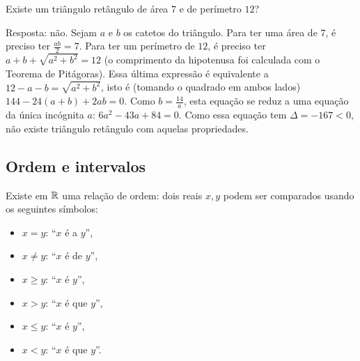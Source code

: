 \begin{exo}
Existe um triângulo retângulo de área $7$ e de perímetro $12$?
\begin{sol} Resposta: não.
Sejam $a$ e $b$ os catetos do triângulo. Para ter uma área de $7$, é preciso ter
$\frac{ab}{2}=7$. Para ter um perímetro de $12$, é preciso ter $a+b+\sqrt{a^2+b^2}=12$
(o comprimento da hipotenusa foi calculada com o Teorema de Pitágoras).
Essa última expressão é equivalente a $12-a-b=\sqrt{a^2+b^2}$, isto é (tomando o quadrado
em ambos lados) $144-24(a+b)+2ab=0$. Como $b=\frac{14}{a}$, esta equação se reduz a uma
equação da única incógnita $a$: $6a^2-43a+84=0$. Como essa equação tem $\Delta=-167<0$,
não existe triângulo retângulo com aquelas propriedades.
\end{sol}
\end{exo}


\subsection{Ordem e intervalos}
Existe em $\mathbb{R}$ uma relação de ordem: dois 
reais $x,y$ podem ser comparados usando os seguintes símbolos:
\begin{itemize}
\item
$x=y$: ``$x$ é  a $y$'',
\item
$x\neq y$: ``$x$ é  de $y$'',
\item 
$x\geq y$: ``$x$ é  $y$'', 
\item 
$x> y$: ``$x$ é  que $y$'', 
\item 
$x\leq y$: ``$x$ é  $y$'',
\item 
$x< y$: ``$x$ é  que $y$''.
\end{itemize}

